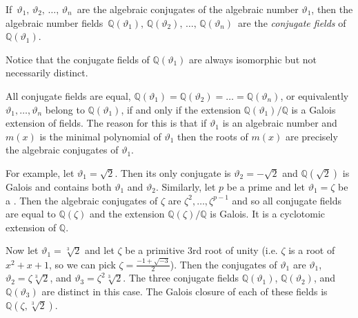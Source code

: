 \documentclass[12pt]{article}
\theoremstyle{definition}
\begin{document}
If\, $\vartheta_1,\,\vartheta_2,\,\ldots,\,\vartheta_n$\, are the algebraic conjugates of the algebraic number $\vartheta_1$, then the algebraic number fields\, $\mathbb{Q}(\vartheta_1),\,\mathbb{Q}(\vartheta_2),\,\ldots,\,\mathbb{Q}(\vartheta_n)$\, 
are the {\em conjugate fields} of $\mathbb{Q}(\vartheta_1)$. 

Notice that the conjugate fields of $\mathbb{Q}(\vartheta_1)$ are always isomorphic but not necessarily distinct. 

All conjugate fields are equal,  $\mathbb{Q}(\vartheta_1)= \mathbb{Q}(\vartheta_2)=\ldots=\mathbb{Q}(\vartheta_n)$, or equivalently $\vartheta_1,\ldots,\vartheta_n$ belong to $\mathbb{Q}(\vartheta_1)$, if and only if the extension $\mathbb{Q}(\vartheta_1)/\mathbb{Q}$ is a Galois extension of fields.  The reason for this is that if $\vartheta_1$ is an algebraic number and $m(x)$ is the minimal polynomial of $\vartheta_1$ then the roots of $m(x)$ are precisely the algebraic conjugates of $\vartheta_1$.

For example, let $\vartheta_1 = \sqrt{2}$.  Then its only conjugate is $\vartheta_2=-\sqrt{2}$ and $\mathbb{Q}(\sqrt{2})$ is Galois and contains both $\vartheta_1$ and $\vartheta_2$.  Similarly, let $p$ be a prime and let $\vartheta_1=\zeta$ be a .  Then the algebraic conjugates of $\zeta$ are $\zeta^2,\ldots,\zeta^{p-1}$ and so all conjugate fields are equal to $\mathbb{Q}(\zeta)$ and the extension $\mathbb{Q}(\zeta)/\mathbb{Q}$ is Galois.  It is a cyclotomic extension of $\mathbb{Q}$.

Now let $\vartheta_1=\sqrt[3]{2}$ and let $\zeta$ be a primitive $3$rd root of unity (i.e. $\zeta$ is a root of $x^2+x+1$, so we can pick $\zeta=\frac{-1+\sqrt{-3}}{2}$).  Then the conjugates of $\vartheta_1$ are $\vartheta_1$, $\vartheta_2=\zeta\sqrt[3]{2}$, and $\vartheta_3=\zeta^2\sqrt[3]{2}$.  The three conjugate fields $\mathbb{Q}(\vartheta_1)$, $\mathbb{Q}(\vartheta_2)$, and $\mathbb{Q}(\vartheta_3)$ are distinct in this case.  The Galois closure of each of these fields is $\mathbb{Q}(\zeta,\sqrt[3]{2})$.
\end{document}
